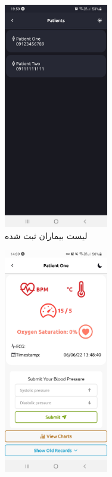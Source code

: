 \begin{figure}[h]
	\centering
	\begin{subfigure}[b]{0.475\textwidth}
		\centering
		\includegraphics[width=0.5\textwidth]{figs/apppatients.jpg}
		\caption[لیست بیماران ثبت شده]%
		{{\small لیست بیماران ثبت شده}}    
		\label{patients}
	\end{subfigure}
	\hfill
	\begin{subfigure}[b]{0.475\textwidth}  
		\centering 
		\includegraphics[width=0.5\textwidth]{figs/apprecords.jpg}

\end{subfigure}
\end{figure}
